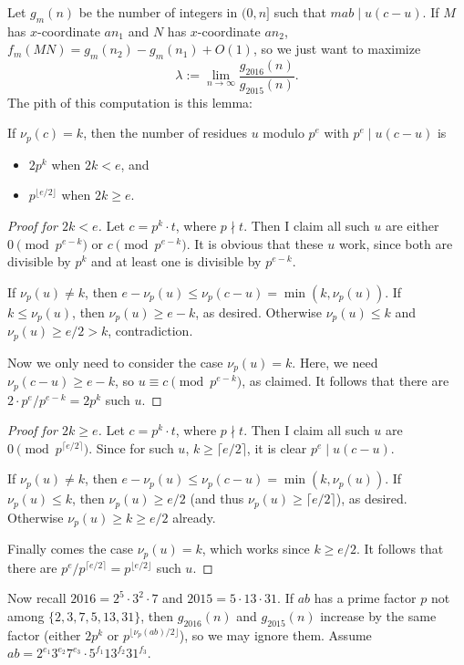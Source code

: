 Let $g_m(n)$ be the number of integers in $(0,n]$ such that $mab\mid u(c-u)$. If $M$ has $x$-coordinate $an_1$ and $N$ has $x$-coordinate $an_2$, $f_m(MN)=g_m(n_2)-g_m(n_1)+O(1)$, so we just want to maximize \[\lambda:=\lim_{n\to\infty}\frac{g_{2016}(n)}{g_{2015}(n)}.\]
The pith of this computation is this lemma:
\begin{lemma*}
    If $\nu_p(c)=k$, then the number of residues $u$ modulo $p^e$ with $p^e\mid u(c-u)$ is
    \begin{itemize}[itemsep=0em]
        \item $2p^k$ when $2k<e$, and
        \item $p^{\lfloor e/2\rfloor}$ when $2k\ge e$.
    \end{itemize}
\end{lemma*}
\begin{proof}[Proof for $2k<e$]
    Let $c=p^k\cdot t$, where $p\nmid t$. Then I claim all such $u$ are either $0\pmod{p^{e-k}}$ or $c\pmod{p^{e-k}}$. It is obvious that these $u$ work, since both are divisible by $p^k$ and at least one is divisible by $p^{e-k}$.

    If $\nu_p(u)\ne k$, then $e-\nu_p(u)\le\nu_p(c-u)=\min(k,\nu_p(u))$. If $k\le\nu_p(u)$, then $\nu_p(u)\ge e-k$, as desired. Otherwise $\nu_p(u)\le k$ and $\nu_p(u)\ge e/2>k$, contradiction.

    Now we only need to consider the case $\nu_p(u)=k$. Here, we need $\nu_p(c-u)\ge e-k$, so $u\equiv c\pmod{p^{e-k}}$, as claimed. It follows that there are $2\cdot p^e/p^{e-k}=2p^k$ such $u$.
\end{proof}
\begin{proof}[Proof for $2k\ge e$]
    Let $c=p^k\cdot t$, where $p\nmid t$. Then I claim all such $u$ are $0\pmod{p^{\lceil e/2\rceil}}$. Since for such $u$, $k\ge\lceil e/2\rceil$, it is clear $p^e\mid u(c-u)$.

    If $\nu_p(u)\ne k$, then $e-\nu_p(u)\le\nu_p(c-u)=\min(k,\nu_p(u))$. If $\nu_p(u)\le k$, then $\nu_p(u)\ge e/2$ (and thus $\nu_p(u)\ge\lceil e/2\rceil$), as desired. Otherwise $\nu_p(u)\ge k\ge e/2$ already.

    Finally comes the case $\nu_p(u)=k$, which works since $k\ge e/2$. It follows that there are $p^e/p^{\lceil e/2\rceil}=p^{\lfloor e/2\rfloor}$ such $u$.
\end{proof}

Now recall $2016=2^5\cdot3^2\cdot7$ and $2015=5\cdot13\cdot31$. If $ab$ has a prime factor $p$ not among $\{2,3,7,5,13,31\}$, then $g_{2016}(n)$ and $g_{2015}(n)$ increase by the same factor (either $2p^k$ or $p^{\lfloor\nu_p(ab)/2\rfloor}$), so we may ignore them. Assume $ab=2^{e_1}3^{e_2}7^{e_3}\cdot5^{f_1}13^{f_2}31^{f_3}$.

